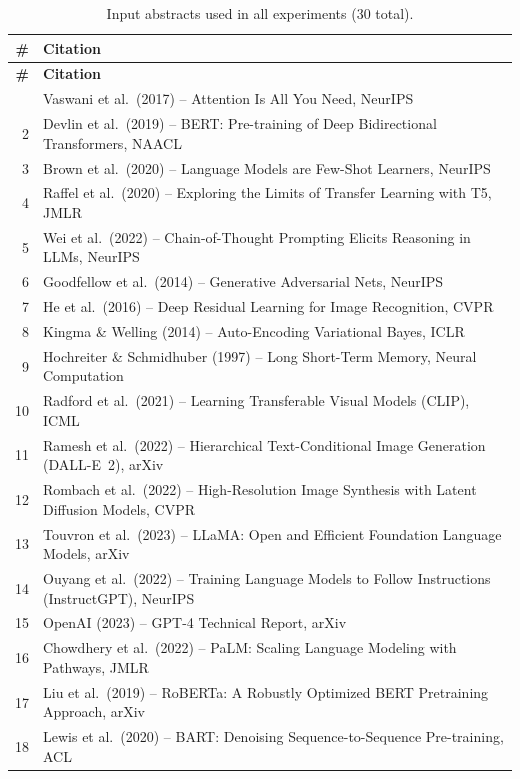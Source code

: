 \documentclass[11pt]{article}
\begin{document}
\begin{longtable}{@{}r p{}@{}}
\caption{Input abstracts used in all experiments (30 total).}
\label{tab:abstracts}\\
\toprule
\textbf{\#} & \textbf{Citation} \\
\midrule
\endfirsthead
\toprule
\textbf{\#} & \textbf{Citation} \\
\midrule
\endhead
\bottomrule
\endfoot
1 & Vaswani et al.\ (2017) -- Attention Is All You Need, NeurIPS \\
2 & Devlin et al.\ (2019) -- BERT: Pre-training of Deep Bidirectional Transformers, NAACL \\
3 & Brown et al.\ (2020) -- Language Models are Few-Shot Learners, NeurIPS \\
4 & Raffel et al.\ (2020) -- Exploring the Limits of Transfer Learning with T5, JMLR \\
5 & Wei et al.\ (2022) -- Chain-of-Thought Prompting Elicits Reasoning in LLMs, NeurIPS \\
6 & Goodfellow et al.\ (2014) -- Generative Adversarial Nets, NeurIPS \\
7 & He et al.\ (2016) -- Deep Residual Learning for Image Recognition, CVPR \\
8 & Kingma \& Welling (2014) -- Auto-Encoding Variational Bayes, ICLR \\
9 & Hochreiter \& Schmidhuber (1997) -- Long Short-Term Memory, Neural Computation \\
10 & Radford et al.\ (2021) -- Learning Transferable Visual Models (CLIP), ICML \\
11 & Ramesh et al.\ (2022) -- Hierarchical Text-Conditional Image Generation (DALL-E~2), arXiv \\
12 & Rombach et al.\ (2022) -- High-Resolution Image Synthesis with Latent Diffusion Models, CVPR \\
13 & Touvron et al.\ (2023) -- LLaMA: Open and Efficient Foundation Language Models, arXiv \\
14 & Ouyang et al.\ (2022) -- Training Language Models to Follow Instructions (InstructGPT), NeurIPS \\
15 & OpenAI (2023) -- GPT-4 Technical Report, arXiv \\
16 & Chowdhery et al.\ (2022) -- PaLM: Scaling Language Modeling with Pathways, JMLR \\
17 & Liu et al.\ (2019) -- RoBERTa: A Robustly Optimized BERT Pretraining Approach, arXiv \\
18 & Lewis et al.\ (2020) -- BART: Denoising Sequence-to-Sequence Pre-training, ACL \\

\end{longtable}
\end{document}
